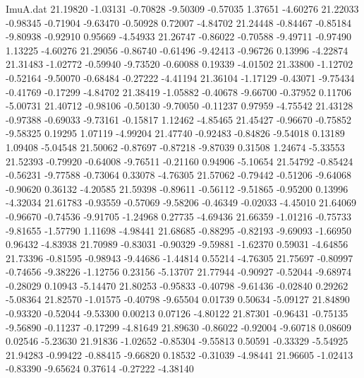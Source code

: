 \begin{filecontents}{ImuA.dat}
  21.19820   -1.03131   -0.70828   -9.50309   -0.57035    1.37651   -4.60276
  21.22033   -0.98345   -0.71904   -9.63470   -0.50928    0.72007   -4.84702
  21.24448   -0.84467   -0.85184   -9.80938   -0.92910    0.95669   -4.54933
  21.26747   -0.86022   -0.70588   -9.49711   -0.97490    1.13225   -4.60276
  21.29056   -0.86740   -0.61496   -9.42413   -0.96726    0.13996   -4.22874
  21.31483   -1.02772   -0.59940   -9.73520   -0.60088    0.19339   -4.01502
  21.33800   -1.12702   -0.52164   -9.50070   -0.68484   -0.27222   -4.41194
  21.36104   -1.17129   -0.43071   -9.75434   -0.41769   -0.17299   -4.84702
  21.38419   -1.05882   -0.40678   -9.66700   -0.37952    0.11706   -5.00731
  21.40712   -0.98106   -0.50130   -9.70050   -0.11237    0.97959   -4.75542
  21.43128   -0.97388   -0.69033   -9.73161   -0.15817    1.12462   -4.85465
  21.45427   -0.96670   -0.75852   -9.58325    0.19295    1.07119   -4.99204
  21.47740   -0.92483   -0.84826   -9.54018    0.13189    1.09408   -5.04548
  21.50062   -0.87697   -0.87218   -9.87039    0.31508    1.24674   -5.33553
  21.52393   -0.79920   -0.64008   -9.76511   -0.21160    0.94906   -5.10654
  21.54792   -0.85424   -0.56231   -9.77588   -0.73064    0.33078   -4.76305
  21.57062   -0.79442   -0.51206   -9.64068   -0.90620    0.36132   -4.20585
  21.59398   -0.89611   -0.56112   -9.51865   -0.95200    0.13996   -4.32034
  21.61783   -0.93559   -0.57069   -9.58206   -0.46349   -0.02033   -4.45010
  21.64069   -0.96670   -0.74536   -9.91705   -1.24968    0.27735   -4.69436
  21.66359   -1.01216   -0.75733   -9.81655   -1.57790    1.11698   -4.98441
  21.68685   -0.88295   -0.82193   -9.69093   -1.66950    0.96432   -4.83938
  21.70989   -0.83031   -0.90329   -9.59881   -1.62370    0.59031   -4.64856
  21.73396   -0.81595   -0.98943   -9.44686   -1.44814    0.55214   -4.76305
  21.75697   -0.80997   -0.74656   -9.38226   -1.12756    0.23156   -5.13707
  21.77944   -0.90927   -0.52044   -9.68974   -0.28029    0.10943   -5.14470
  21.80253   -0.95833   -0.40798   -9.61436   -0.02840    0.29262   -5.08364
  21.82570   -1.01575   -0.40798   -9.65504    0.01739    0.50634   -5.09127
  21.84890   -0.93320   -0.52044   -9.53300    0.00213    0.07126   -4.80122
  21.87301   -0.96431   -0.75135   -9.56890   -0.11237   -0.17299   -4.81649
  21.89630   -0.86022   -0.92004   -9.60718    0.08609    0.02546   -5.23630
  21.91836   -1.02652   -0.85304   -9.55813    0.50591   -0.33329   -5.54925
  21.94283   -0.99422   -0.88415   -9.66820    0.18532   -0.31039   -4.98441
  21.96605   -1.02413   -0.83390   -9.65624    0.37614   -0.27222   -4.38140

\end{filecontents}
